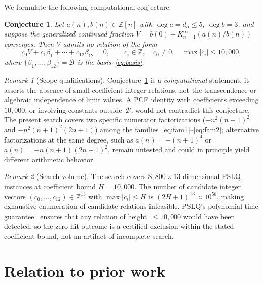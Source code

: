 \documentclass[11pt]{amsart}
\newcommand{\Z}{\mathbb{Z}}
\newcommand{\calB}{\mathcal{B}}
\theoremstyle{plain}
\newtheorem{conjecture}{Conjecture}
\theoremstyle{remark}
\newtheorem{remark}{Remark}
\begin{document}
We formulate the following computational conjecture.

\begin{conjecture}\label{conj:desert}
Let $a(n), b(n) \in \Z[n]$ with $\deg a = d_a \leq 5$,
$\deg b = 3$, and suppose the generalized continued fraction
$V = b(0) + K_{n=1}^{\infty}(a(n)/b(n))$ converges.
Then $V$ admits no relation of the form
\[
  c_0 V + c_1 \beta_1 + \cdots + c_{12} \beta_{12} = 0,
  \qquad c_i \in \Z, \quad c_0 \neq 0,
  \quad \max|c_i| \leq 10{,}000,
\]
where $\{\beta_1, \ldots, \beta_{12}\} = \calB$
is the basis~\eqref{eq:basis}.
\end{conjecture}

\begin{remark}[Scope qualifications]
Conjecture~\ref{conj:desert} is a \emph{computational} statement:
it asserts the absence of small-coefficient integer relations,
not the transcendence or algebraic independence of limit values.
A PCF identity with coefficients exceeding $10{,}000$, or
involving constants outside~$\calB$, would not contradict
this conjecture.
The present search covers two specific numerator factorizations
($-n^2(n+1)^2$ and $-n^2(n+1)^2(2n+1)$) among the
families~\eqref{eq:fam1}--\eqref{eq:fam2};
alternative factorizations at the same degree, such as
$a(n) = -(n+1)^4$ or $a(n) = -n(n+1)(2n+1)^2$,
remain untested and could in principle yield different
arithmetic behavior.
\end{remark}

\begin{remark}[Search volume]
The search covers $8{,}800 \times 13$-dimensional PSLQ instances
at coefficient bound $H = 10{,}000$.
The number of candidate integer vectors
$(c_0, \ldots, c_{12}) \in \Z^{13}$
with $\max|c_i| \leq H$ is $(2H+1)^{13} \approx 10^{56}$,
making exhaustive enumeration of candidate relations infeasible.
PSLQ's polynomial-time guarantee~\cite{ferguson1999} ensures that
any relation of height~$\leq 10{,}000$ would have been detected,
so the zero-hit outcome is a certified exclusion within the
stated coefficient bound, not an artifact of incomplete search.
\end{remark}

\section{Relation to prior work}\label{sec:prior}
\end{document}
